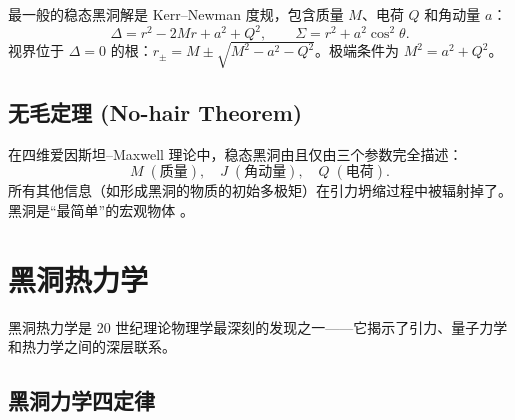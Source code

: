 最一般的稳态黑洞解是 Kerr–Newman 度规，包含质量 $M$、电荷 $Q$ 和角动量 $a$：
\begin{equation}
    \Delta = r^2 - 2Mr + a^2 + Q^2, \qquad \Sigma = r^2 + a^2\cos^2\theta.
\end{equation}
视界位于 $\Delta=0$ 的根：$r_\pm = M \pm \sqrt{M^2 - a^2 - Q^2}$。极端条件为 $M^2 = a^2 + Q^2$。

\subsection{无毛定理 (No-hair Theorem)}

\begin{theorem}[黑洞无毛定理]
在四维爱因斯坦–Maxwell 理论中，稳态黑洞由且仅由三个参数完全描述：
\begin{equation}
    \boxed{M\;(\text{质量}),\quad J\;(\text{角动量}),\quad Q\;(\text{电荷})}.
\end{equation}
所有其他信息（如形成黑洞的物质的初始多极矩）在引力坍缩过程中被辐射掉了。黑洞是“最简单”的宏观物体 \cite{Wald1984,Carroll1997}。
\end{theorem}

\section{黑洞热力学}
\label{sec:BH_thermo}

黑洞热力学是 20 世纪理论物理学最深刻的发现之一——它揭示了引力、量子力学和热力学之间的深层联系。

\subsection{黑洞力学四定律}

